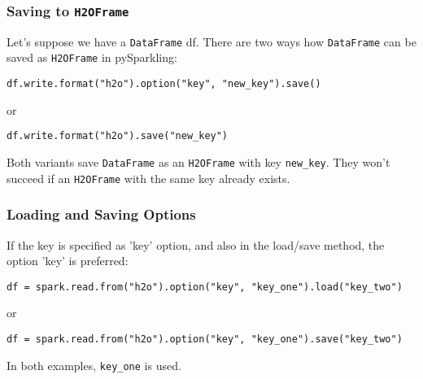 \subsubsection{Saving to \texttt{H2OFrame}}

Let's suppose we have a \texttt{DataFrame} df. There are two ways how \texttt{DataFrame} can be saved as 
\texttt{H2OFrame} in pySparkling:

\begin{lstlisting}[style=Scala]
df.write.format("h2o").option("key", "new_key").save()
\end{lstlisting}
or
\begin{lstlisting}[style=Scala]
df.write.format("h2o").save("new_key")
\end{lstlisting}

Both variants save \texttt{DataFrame} as an \texttt{H2OFrame} with key \texttt{new\_key}. They won't succeed if an \texttt{H2OFrame} with the same key already exists.

\subsubsection{Loading and Saving Options}

If the key is specified as 'key' option, and also in the load/save method, the option 'key' is preferred:
\begin{lstlisting}[style=Scala]
df = spark.read.from("h2o").option("key", "key_one").load("key_two")
\end{lstlisting}
or
\begin{lstlisting}[style=Scala]
df = spark.read.from("h2o").option("key", "key_one").save("key_two")
\end{lstlisting}

In both examples, \texttt{key\_one} is used.

